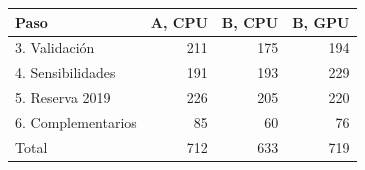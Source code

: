 \begin{tabular}{lrrr}
\toprule
Paso & A, CPU & B, CPU & B, GPU \\
\midrule
3. Validación & 211 & 175 & 194 \\
4. Sensibilidades & 191 & 193 & 229 \\
5. Reserva 2019 & 226 & 205 & 220 \\
6. Complementarios & 85 & 60 & 76 \\
\midrule
Total & 712 & 633 & 719 \\
\bottomrule
\end{tabular}